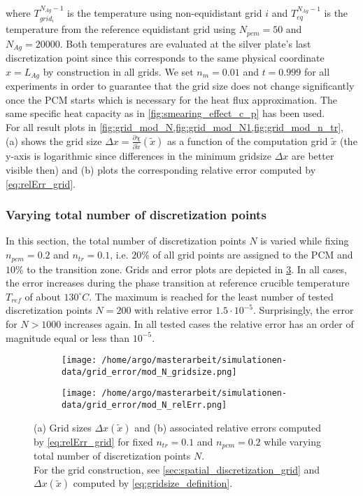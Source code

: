 \documentclass{scrartcl}[12pt, halfparskip]
\numberwithin{equation}{section}
\numberwithin{figure}{section}
\numberwithin{table}{section}
\begin{document}
where $T_{grid_i}^{N_{Ag}-1}$ is the temperature using non-equidistant grid $i$ and $T_{eq}^{N_{Ag}-1}$ is the temperature from the reference equidistant grid using $N_{pcm}=50$ and $N_{Ag}=20000$. Both temperatures are evaluated at the silver plate's last discretization point since this corresponds to the same physical coordinate $x=L_{Ag}$ by construction in all grids. 
We set $n_m=0.01$ and $t=0.999$ for all experiments in order to guarantee that the grid size does not change significantly once the PCM starts which is necessary for the heat flux approximation. The same specific heat capacity as in \cref{fig:smearing_effect_c_p} has been used. \\
For all result plots in \cref{fig:grid_mod_N,fig:grid_mod_N1,fig:grid_mod_n_tr}, (a) shows the grid size $\Delta x = \frac{\partial \chi}{\partial \tilde{x}}(\tilde{x})$ as a function of the computation grid $\tilde{x}$ (the y-axis is logarithmic since differences in the minimum gridsize $\Delta x$ are better visible then) and (b) plots the corresponding relative error computed by \cref{eq:relErr_grid}.

\subsubsection{Varying total number of discretization points}
In this section, the total number of discretization points $N$ is varied while fixing $n_{pcm}=0.2$ and $n_{tr}=0.1$, i.e. $20\%$ of all grid points are assigned to the PCM and $10\%$ to the transition zone. Grids and error plots are depicted in \cref{fig:grid_mod_N}.
In all cases, the error increases during the phase transition at reference crucible temperature $T_{ref}$ of about $130^{\circ} C$. The maximum is reached for the least number of tested discretization points $N=200$ with relative error $1.5 \cdot 10^{-5}$. Surprisingly, the error for $N > 1000$ increases again. In all tested cases the relative error has an order of magnitude equal or less than $10^{-5}$. 


\begin{figure}[H]
	\begin{subfigure}{0.49\textwidth}
		\texttt{[image: /home/argo/masterarbeit/simulationen-data/grid\_error/mod\_N\_gridsize.png]}
		\caption{}
		\label{fig:gridsize_mod_N}
	\end{subfigure}
	\begin{subfigure}{0.49\textwidth}
		\texttt{[image: /home/argo/masterarbeit/simulationen-data/grid\_error/mod\_N\_relErr.png]}
		\caption{}
		\label{fig:grid_relErr_mod_N}
	\end{subfigure}
	\caption{(a) Grid sizes $\Delta x(\tilde{x})$ and (b) associated relative errors computed by \cref{eq:relErr_grid} for fixed $n_{tr}=0.1$ and $n_{pcm}=0.2$ while varying total number of discretization points $N$. \\
	For the grid construction, see \cref{sec:spatial_discretization_grid} and $\Delta x(\tilde{x})$ computed by \cref{eq:gridsize_definition}.}
	\label{fig:grid_mod_N}
\end{figure}
\end{document}
